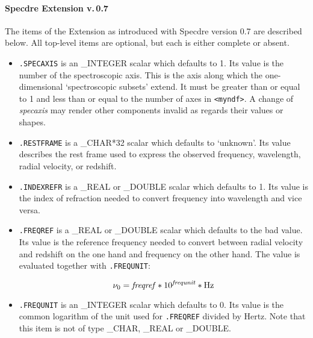 
\paragraph{Specdre Extension v.\,0.7}

   The items of the Extension as introduced with Specdre version 0.7 are
   described below. All top-level items are optional, but each is either
   complete or absent.

\begin{itemize}

\item{\tt .SPECAXIS} is an \_INTEGER scalar which defaults to 1. Its
   value is the number of the spectroscopic axis. This is the axis along
   which the one-dimensional `spectroscopic subsets' extend. It must
   be greater than or equal to 1 and less than or equal to the number of
   axes in {\tt <myndf>}. A change of {\it specaxis} may render other
   components invalid as regards their values or shapes.

\item{\tt .RESTFRAME} is a \_CHAR*32 scalar which defaults to
   `unknown'.  Its value describes the rest frame used to express the
   observed frequency, wavelength, radial velocity, or redshift.

\item{\tt .INDEXREFR} is a \_REAL or \_DOUBLE scalar which defaults to
   1. Its value is the index of refraction needed to convert frequency
   into wavelength and vice versa.

\item{\tt .FREQREF} is a \_REAL or \_DOUBLE scalar which defaults to the
   bad value. Its value is the reference frequency needed to convert
   between radial velocity and redshift on the one hand and frequency on
   the other hand. The value is evaluated together with {\tt .FREQUNIT}:

   \[\nu_0={\it freqref}*10^{\it frequnit}*{\rm Hz}\]

\item{\tt .FREQUNIT} is an \_INTEGER scalar which defaults to 0. Its
   value is the common logarithm of the unit used for {\tt .FREQREF}
   divided by Hertz.  Note that this item is not of type \_CHAR, \_REAL
   or \_DOUBLE.


\end{itemize}
